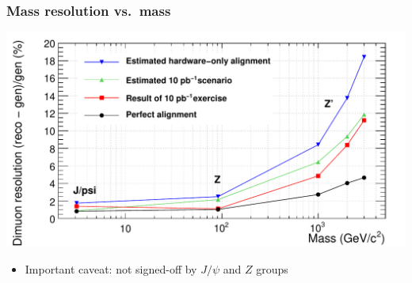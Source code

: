 \documentclass[compress]{beamer}
\begin{document}
\begin{frame}
\frametitle{Mass resolution vs.~mass}

\includegraphics[width=\linewidth]{mass_resolution.pdf}

\begin{itemize}
\item Important caveat: not signed-off by $J/\psi$ and $Z$ groups
\end{itemize}
\end{frame}
\end{document}
